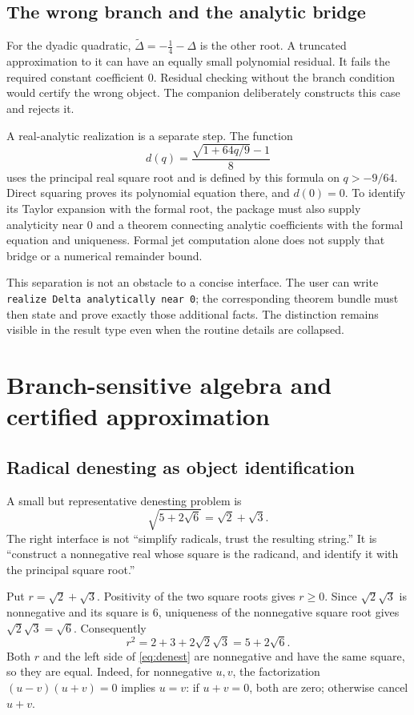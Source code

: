 \documentclass[11pt,letterpaper]{article}
\newcommand{\code}[1]{\nolinkurl{#1}}
\theoremstyle{definition}
\theoremstyle{remark}
\begin{document}
\subsection{The wrong branch and the analytic bridge}
For the dyadic quadratic, $\widetilde\Delta=-\tfrac14-\Delta$ is the other root.
A truncated approximation to it can have an equally small polynomial residual.
It fails the required constant coefficient $0$. Residual checking without the
branch condition would certify the wrong object. The companion deliberately
constructs this case and rejects it.

A real-analytic realization is a separate step. The function
\[
 d(q)=\frac{\sqrt{1+64q/9}-1}{8}
\]
uses the principal real square root and is defined by this formula on
$q>-9/64$. Direct squaring proves its polynomial equation there, and $d(0)=0$.
To identify its Taylor expansion with the formal root, the package must also
supply analyticity near $0$ and a theorem connecting analytic coefficients
with the formal equation and uniqueness. Formal jet computation alone does
not supply that bridge or a numerical remainder bound.

This separation is not an obstacle to a concise interface. The user can write
\code{realize Delta analytically near 0}; the corresponding theorem bundle must
then state and prove exactly those additional facts. The distinction remains
visible in the result type even when the routine details are collapsed.

\section{Branch-sensitive algebra and certified approximation}
\label{sec:radicals}

\subsection{Radical denesting as object identification}
A small but representative denesting problem is
\begin{equation}
 \sqrt{5+2\sqrt6}=\sqrt2+\sqrt3.
 \label{eq:denest}
\end{equation}
The right interface is not ``simplify radicals, trust the resulting string.''
It is ``construct a nonnegative real whose square is the radicand, and identify
it with the principal square root.''

Put $r=\sqrt2+\sqrt3$. Positivity of the two square roots gives $r\geq0$.
Since $\sqrt2\sqrt3$ is nonnegative and its square is $6$, uniqueness of the
nonnegative square root gives $\sqrt2\sqrt3=\sqrt6$. Consequently
\[
 r^2=2+3+2\sqrt2\sqrt3=5+2\sqrt6.
\]
Both $r$ and the left side of \eqref{eq:denest} are nonnegative and have the same
square, so they are equal. Indeed, for nonnegative $u,v$, the factorization
$(u-v)(u+v)=0$ implies $u=v$: if $u+v=0$, both are zero; otherwise cancel $u+v$.
\end{document}
